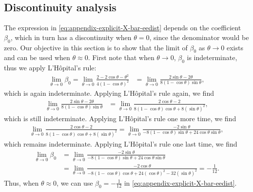 \subsection{Discontinuity analysis}\label{app:discontinuity-beta-EEdist}
The expression in \eqref{eq:appendix-explicit-X-bar-eedist} depends on the coefficient $\beta_0$, which in turn has a discontinuity when $\theta=0$, since the denominator would be zero. Our objective in this section is to show that the limit of $\beta_0$ as $\theta\to 0$ exists and can be used when $\theta\approx0$. First note that when $\theta\to 0$, $\beta_0$ is indeterminate, thus we apply L'Hôpital's rule:
\begin{align}
    \lim_{\theta\to0}\beta_0=\lim_{\theta\to0} \frac{2-2\cos\theta-\theta^2}{4(1 - \cos\theta)^2}
    &= \lim_{\theta\to0} \frac{2\sin\theta-2\theta}{8(1 - \cos\theta)\sin\theta},
\end{align}
which is again indeterminate. Applying L'Hôpital's rule again, we find
\begin{align}
    \lim_{\theta\to0} \frac{2\sin\theta-2\theta}{8(1 - \cos\theta)\sin\theta}
    &= \lim_{\theta\to0} \frac{2\cos\theta-2}{8(1 - \cos\theta)\cos\theta +8(\sin\theta)^2},
\end{align}
which is still indeterminate. Applying L'Hôpital's rule one more time, we find
\begin{align}
    \lim_{\theta\to0} \frac{2\cos\theta-2}{8(1 - \cos\theta)\cos\theta +8(\sin\theta)^2} =
    \lim_{\theta\to0}\frac{-2\sin\theta}{-8(1 - \cos\theta)\sin\theta +24\cos\theta\sin\theta},
\end{align}
which remains indeterminate. Applying L'Hôpital's rule one last time, we find
\begin{align}
    \lim_{\theta\to0}\beta_0&=\lim_{\theta\to0}\frac{-2\sin\theta}{-8(1 - \cos\theta)\sin\theta +24\cos\theta\sin\theta} \\
    &=
    \lim_{\theta\to0}\frac{-2\cos\theta}{-8(1 - \cos\theta)\cos\theta +24(\cos\theta)^2-32(\sin\theta)^2} = -\frac{1}{12}.
\end{align}
Thus, when $\theta\approx0$, we can use $\beta_0=-\frac{1}{12}$ in \eqref{eq:appendix-explicit-X-bar-eedist}.


